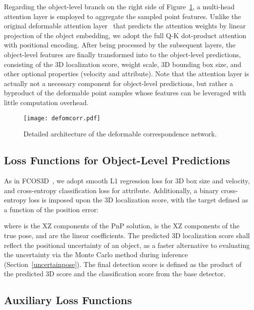 \documentclass[10pt,twocolumn,letterpaper]{article}
\begin{document}
Regarding the object-level branch on the right side of Figure~\ref{fig:deformcorr}, a multi-head attention layer is employed to aggregate the sampled point features. Unlike the original deformable attention layer~\cite{deformabledetr} that predicts the attention weights by linear projection of the object embedding, we adopt the full Q-K dot-product attention with positional encoding. After being processed by the subsequent layers, the object-level features are finally transformed into to the object-level predictions, consisting of the 3D localization score, weight scale, 3D bounding box size, and other optional properties (velocity and attribute). Note that the attention layer is actually not a necessary component for object-level predictions, but rather a byproduct of the deformable point samples whose features can be leveraged with little computation overhead.

\begin{figure}[t]
\begin{center}
    \texttt{[image: defomcorr.pdf]}
\end{center}
\vspace{-1ex}
\caption{Detailed architecture of the deformable correspondence network.}
\label{fig:deformcorr}
\end{figure}

\subsection{Loss Functions for Object-Level Predictions}
As in FCOS3D~\cite{fcos3d}, we adopt smooth L1 regression loss for 3D box size and velocity, and cross-entropy classification loss for attribute. Additionally, a binary cross-entropy loss is imposed upon the 3D localization score, with the target  defined as a function of the position error:

where  is the XZ components of the PnP solution,  is the XZ components of the true pose, and  are the linear coefficients. The predicted 3D localization score  shall reflect the positional uncertainty of an object, as a faster alternative to evaluating the uncertainty via the Monte Carlo method during inference (Section~\ref{uncertainpose}). The final detection score is defined as the product of the predicted 3D score and the classification score from the base detector. 

\subsection{Auxiliary Loss Functions}
\end{document}
